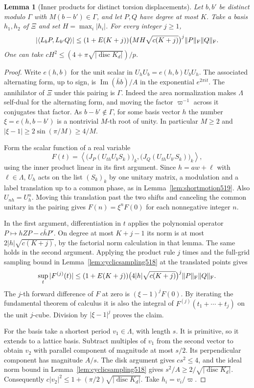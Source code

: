 \documentclass[a4paper,11pt]{article}
\newtheorem{lemma}[proposition]{Lemma}
\theoremstyle{definition}
\theoremstyle{remark}
\numberwithin{equation}{section}
\begin{document}
\begin{lemma}[Inner products for distinct torsion displacements]\leavevmode
\label{lem:crossshift520}
Let \(b,b'\) be distinct modulo \(\Gamma\) with
\(M(b-b')\in\Gamma\), and let \(P,Q\) have degree at most \(K\).
Take a basis \(h_1,h_2\) of \(\Xi\) and set
\(H=\max_i|h_i|\). For every integer \(j\ge1\),
\[
 |\langle L_bP,L_{b'}Q\rangle|
 \le (1+E(K+j))\bigl(MH\sqrt{c(K+j)}\bigr)^j
                          \|P\|_{\rm F}\|Q\|_{\rm F} .
\]
One can take \(cH^2\le (4+\pi\sqrt{|\operatorname{disc}K_d|})/p\).
\end{lemma}
\begin{proof}
Write \(e(h,b)\) for the unit scalar in \(U_hU_b=e(h,b)U_bU_h\).
The associated alternating form, up to sign, is
\(\operatorname{Im}(\bar h b)/A\) in the exponential \(e^{2\pi i t}\).
The annihilator of \(\Xi\) under this pairing is \(\Gamma\).
Indeed the area normalization makes \(\Lambda\) self-dual for the
alternating form, and moving the factor \(\varpi^{-1}\) across it
conjugates that factor. As \(b-b'\notin\Gamma\), for some basis
vector \(h\) the number \(\xi=e(h,b-b')\) is a nontrivial
\(M\)-th root of unity. In particular \(M\ge2\) and
\(|\xi-1|\ge2\sin(\pi/M)\ge4/M\).

Form the scalar function of a real variable
\[
 F(t)=\left\langle
   \big(J_P(U_{th}U_bS_k)\big)_k,
   \big(J_Q(U_{th}U_{b'}S_k)\big)_k\right\rangle ,
\]
using the inner product linear in its first argument. Since
\(h=aw+\ell\) with \(\ell\in\Lambda\), \(U_h\) acts on the list
\((S_k)_k\) by one unitary matrix, a modulation and a label
translation up to a common phase, as in Lemma~\ref{lem:shortmotion519}.
Also \(U_{nh}=U_h^n\). Moving this translation past the two shifts
and canceling the common unitary in the pairing gives
\(F(n)=\xi^n F(0)\) for each nonnegative integer \(n\).

In the first argument, differentiation in \(t\) applies the
polynomial operator \(P\mapsto hZP-c\bar h P'\). On degree at
most \(K+j-1\) its norm is at most \(2|h|\sqrt{c(K+j)}\), by
the factorial norm calculation in that lemma. The same holds in
the second argument. Applying the product rule \(j\) times and
the full-grid sampling bound in Lemma~\ref{lem:cyclicsampling518}
at the translated points gives
\[
 \sup_t |F^{(j)}(t)|\le (1+E(K+j))
     \bigl(4|h|\sqrt{c(K+j)}\bigr)^j\|P\|_{\rm F}\|Q\|_{\rm F}.
\]
The \(j\)-th forward difference of \(F\) at zero is
\((\xi-1)^jF(0)\). By iterating the fundamental theorem of calculus
it is also the integral of \(F^{(j)}(t_1+\cdots+t_j)\) on the
unit \(j\)-cube. Division by \(|\xi-1|^j\) proves the claim.

For the basis take a shortest period \(v_1\in\Lambda\), with
length \(s\). It is primitive, so it extends to a lattice basis.
Subtract multiples of \(v_1\) from the second vector to obtain
\(v_2\) with parallel component of magnitude at most \(s/2\).
Its perpendicular component has magnitude \(A/s\). The disk
argument gives \(cs^2\le4\), and the ideal norm bound in
Lemma~\ref{lem:cyclicsampling518} gives \(s^2/A\ge 2/\sqrt{|\operatorname{disc}K_d|}\).
Consequently \(c|v_2|^2\le1+(\pi/2)\sqrt{|\operatorname{disc}K_d|}\).
Take \(h_i=v_i/\varpi\).
\end{proof}
\end{document}
